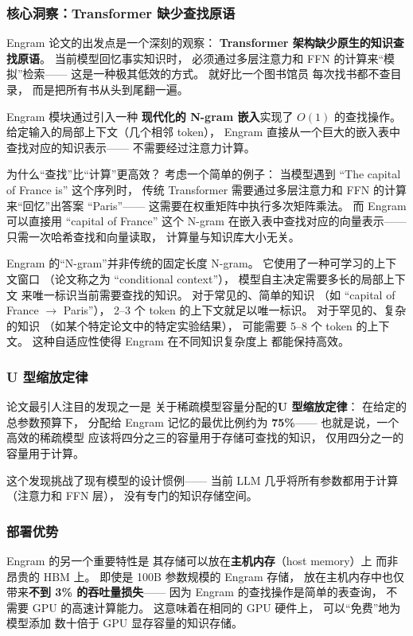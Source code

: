 \subsubsection{核心洞察：Transformer 缺少查找原语}

Engram 论文的出发点是一个深刻的观察：
\textbf{Transformer 架构缺少原生的知识查找原语}。
当前模型回忆事实知识时，
必须通过多层注意力和 FFN 的计算来“模拟”检索——
这是一种极其低效的方式。
就好比一个图书馆员
每次找书都不查目录，
而是把所有书从头到尾翻一遍。

Engram 模块通过引入一种
\textbf{现代化的 N-gram 嵌入}实现了 $O(1)$ 的查找操作。
给定输入的局部上下文（几个相邻 token），
Engram 直接从一个巨大的嵌入表中
查找对应的知识表示——
不需要经过注意力计算。

为什么“查找”比“计算”更高效？
考虑一个简单的例子：
当模型遇到 “The capital of France is” 这个序列时，
传统 Transformer 需要通过多层注意力和 FFN 的计算
来“回忆”出答案 “Paris”——
这需要在权重矩阵中执行多次矩阵乘法。
而 Engram 可以直接用 “capital of France” 这个 N-gram
在嵌入表中查找对应的向量表示——
只需一次哈希查找和向量读取，
计算量与知识库大小无关。

Engram 的“N-gram”并非传统的固定长度 N-gram。
它使用了一种可学习的上下文窗口
（论文称之为 “conditional context”），
模型自主决定需要多长的局部上下文
来唯一标识当前需要查找的知识。
对于常见的、简单的知识
（如 “capital of France $\to$ Paris”），
2--3 个 token 的上下文就足以唯一标识。
对于罕见的、复杂的知识
（如某个特定论文中的特定实验结果），
可能需要 5--8 个 token 的上下文。
这种自适应性使得 Engram 在不同知识复杂度上
都能保持高效。

\subsubsection{U 型缩放定律}

论文最引人注目的发现之一是
关于稀疏模型容量分配的\textbf{U 型缩放定律}：
在给定的总参数预算下，
分配给 Engram 记忆的最优比例约为 \textbf{75\%}——
也就是说，一个高效的稀疏模型
应该将四分之三的容量用于存储可查找的知识，
仅用四分之一的容量用于计算。

这个发现挑战了现有模型的设计惯例——
当前 LLM 几乎将所有参数都用于计算
（注意力和 FFN 层），
没有专门的知识存储空间。

\subsubsection{部署优势}

Engram 的另一个重要特性是
其存储可以放在\textbf{主机内存}（host memory）上
而非昂贵的 HBM 上。
即使是 100B 参数规模的 Engram 存储，
放在主机内存中也仅带来\textbf{不到 3\% 的吞吐量损失}——
因为 Engram 的查找操作是简单的表查询，
不需要 GPU 的高速计算能力。
这意味着在相同的 GPU 硬件上，
可以“免费”地为模型添加
数十倍于 GPU 显存容量的知识存储。

